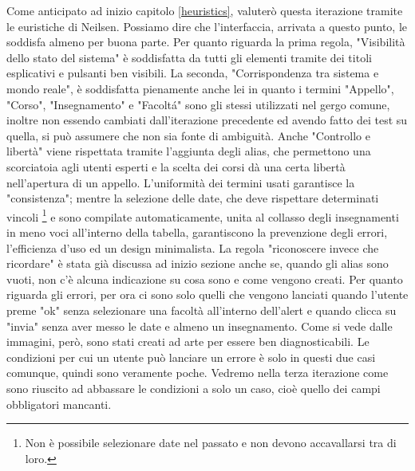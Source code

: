 \documentclass[Lau, oneside, noexaminfo]{sapthesis}%
\begin{document}
Come anticipato ad inizio capitolo \ref{heuristics}, valuterò questa iterazione tramite le euristiche di Neilsen. Possiamo dire che l'interfaccia, arrivata a questo punto, le soddisfa almeno per buona parte.
Per quanto riguarda la prima regola, "Visibilità dello stato del sistema" è soddisfatta da tutti gli elementi tramite dei titoli esplicativi e pulsanti ben visibili. La seconda, "Corrispondenza tra sistema e mondo reale", è soddisfatta pienamente anche lei in quanto i termini "Appello", "Corso", "Insegnamento" e "Facolt\'a" sono gli stessi utilizzati nel gergo comune, inoltre non essendo cambiati dall'iterazione precedente ed avendo fatto dei test su quella, si può assumere che non sia fonte di ambiguità. Anche "Controllo e libertà" viene rispettata tramite l'aggiunta degli alias, che permettono una scorciatoia agli utenti esperti e la scelta dei corsi dà una certa libertà nell'apertura di un appello. L'uniformità dei termini usati garantisce la "consistenza"; mentre la selezione delle date, che deve rispettare determinati vincoli \footnote{Non è possibile selezionare date nel passato e non devono accavallarsi tra di loro.} e sono compilate automaticamente, unita al collasso degli insegnamenti in meno voci all'interno della tabella, garantiscono la prevenzione degli errori, l'efficienza d'uso ed un design minimalista. La regola "riconoscere invece che ricordare" è stata già discussa ad inizio sezione anche se, quando gli alias sono vuoti, non c'è alcuna indicazione su cosa sono e come vengono creati. Per quanto riguarda gli errori, per ora ci sono solo quelli che vengono lanciati quando l'utente preme "ok" senza selezionare una facoltà all'interno dell'alert e quando clicca su "invia" senza aver messo le date e almeno un insegnamento. Come si vede dalle immagini, però, sono stati creati ad arte per essere ben diagnosticabili. Le condizioni per cui un utente può lanciare un errore è solo in questi due casi comunque, quindi sono veramente poche. Vedremo nella terza iterazione come sono riuscito ad abbassare le condizioni a solo un caso, cioè quello dei campi obbligatori mancanti.
\end{document}
